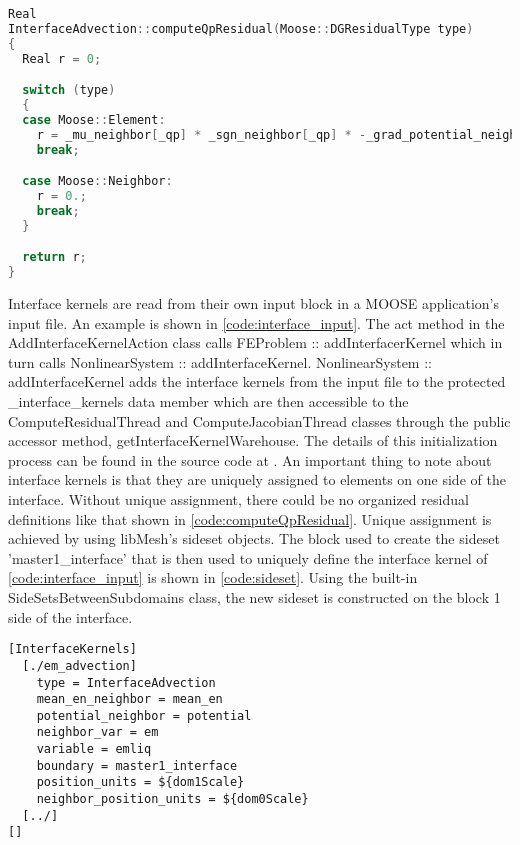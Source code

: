 \begin{lstlisting}[language = C++, caption = InterfaceAdvection::computeQpResidual method, label = code:computeQpResidual]
Real
InterfaceAdvection::computeQpResidual(Moose::DGResidualType type)
{
  Real r = 0;

  switch (type)
  {
  case Moose::Element:
    r = _mu_neighbor[_qp] * _sgn_neighbor[_qp] * -_grad_potential_neighbor[_qp] * _r_neighbor_units * std::exp(_neighbor_value[_qp]) * _normals[_qp] * _test[_i][_qp] * _r_units;
    break;

  case Moose::Neighbor:
    r = 0.;
    break;
  }

  return r;
}
\end{lstlisting}

Interface kernels are read from their own input block in a MOOSE application's input file. An example is shown in \cref{code:interface_input}. The act method in the AddInterfaceKernelAction class calls FEProblem :: addInterfacerKernel which in turn calls NonlinearSystem :: addInterfaceKernel. NonlinearSystem :: addInterfaceKernel adds the interface kernels from the input file to the protected \_interface\_kernels data member which are then accessible to the ComputeResidualThread and ComputeJacobianThread classes through the public accessor method, getInterfaceKernelWarehouse. The details of this initialization process can be found in the source code at \cite{mooseSite}. An important thing to note about interface kernels is that they are uniquely assigned to elements on one side of the interface. Without unique assignment, there could be no organized residual definitions like that shown in \cref{code:computeQpResidual}. Unique assignment is achieved by using libMesh's sideset objects. The block used to create the sideset 'master1\_interface' that is then used to uniquely define the interface kernel of \cref{code:interface_input} is shown in \cref{code:sideset}. Using the built-in SideSetsBetweenSubdomains class, the new sideset is constructed on the block 1 side of the interface.

\begin{lstlisting}[caption = Example of input block for an interface kernel (InterfaceAdvection in this case), label = code:interface_input]
[InterfaceKernels]
  [./em_advection]
    type = InterfaceAdvection
    mean_en_neighbor = mean_en
    potential_neighbor = potential
    neighbor_var = em
    variable = emliq
    boundary = master1_interface
    position_units = ${dom1Scale}
    neighbor_position_units = ${dom0Scale}
  [../]
[]
\end{lstlisting}

